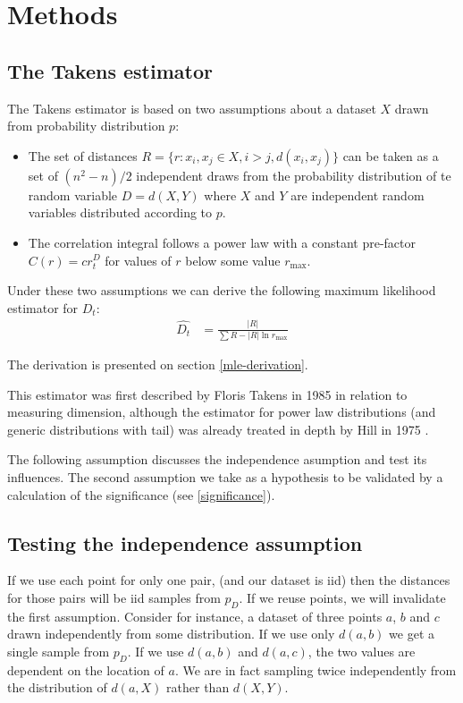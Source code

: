 \documentclass[11pt]{article}
\begin{document}
\section{Methods}
\label{methods}

\subsection{The Takens estimator}

The Takens estimator is based on two assumptions about a dataset $X$ drawn from probability distribution $p$:
\begin{itemize}
  \item The set of distances $R = \{r : x_i, x_j \in X, i>j, d(x_i, x_j)\}$ can be taken as a set of $(n^2 - n)/2$ independent draws from the probability distribution of te random variable $D = d(X, Y)$ where $X$ and $Y$ are independent random variables distributed according to $p$.
  \item The correlation integral follows a power law with a constant pre-factor $C(r) = c r^D_t$ for values of $r$ below some value $r_{\max}$.
\end{itemize}

Under these two assumptions we can derive the following maximum likelihood estimator for $D_t$:
\begin{align*}
\widehat{D_t} &= \frac{|R|}{\sum{R} - |R| \ln r_{\max}}
\end{align*}

The derivation is presented on section \ref{mle-derivation}. 

This estimator was first described by Floris Takens in 1985 \cite{takens1985numerical} in relation to measuring dimension, although the estimator for power law distributions (and generic distributions with tail) was already treated in depth by Hill in 1975 \cite{hill1975simple}.

The following assumption discusses the independence asumption and test its influences. The second assumption we take as a hypothesis to be validated by a calculation of the significance (see \ref{significance}). 

\subsection{Testing the independence assumption}
\label{independence}
If we use each point for only one pair, (and our dataset is iid) then the distances for those pairs will be iid samples from $p_D$. If we reuse points, we will invalidate the first assumption. Consider for instance, a dataset of three points $a$, $b$ and $c$ drawn independently from some distribution. If we use only $d(a, b)$ we get a single sample from $p_D$. If we use $d(a, b)$ and $d(a, c)$, the two values are dependent on the location of $a$. We are in fact sampling twice independently from the distribution of $d(a, X)$ rather than $d(X, Y)$.
 
\end{document}
